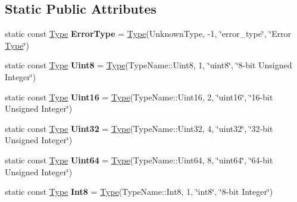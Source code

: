 \subsection*{Static Public Attributes}
\begin{DoxyCompactItemize}
\item 
\mbox{\label{class_arcana_1_1_types_a9f3eec1163e2931ed87aed5e7b847aa5}} 
static const \mbox{\hyperlink{class_arcana_1_1_type}{Type}} {\bfseries Error\+Type} = \mbox{\hyperlink{class_arcana_1_1_type}{Type}}(Unknown\+Type, -\/1, \char`\"{}error\+\_\+type\char`\"{}, \char`\"{}Error \mbox{\hyperlink{class_arcana_1_1_type}{Type}}\char`\"{})
\item 
\mbox{\label{class_arcana_1_1_types_a77949f4b6273c0b012bf2c3928ffce95}} 
static const \mbox{\hyperlink{class_arcana_1_1_type}{Type}} {\bfseries Uint8} = \mbox{\hyperlink{class_arcana_1_1_type}{Type}}(Type\+Name\+::\+Uint8, 1, \char`\"{}uint8\char`\"{}, \char`\"{}8-\/bit Unsigned Integer\char`\"{})
\item 
\mbox{\label{class_arcana_1_1_types_a65012cc73a88ba8c577901fb864b65f9}} 
static const \mbox{\hyperlink{class_arcana_1_1_type}{Type}} {\bfseries Uint16} = \mbox{\hyperlink{class_arcana_1_1_type}{Type}}(Type\+Name\+::\+Uint16, 2, \char`\"{}uint16\char`\"{}, \char`\"{}16-\/bit Unsigned Integer\char`\"{})
\item 
\mbox{\label{class_arcana_1_1_types_a2a4ef23dde14a315f1a377790cd71cde}} 
static const \mbox{\hyperlink{class_arcana_1_1_type}{Type}} {\bfseries Uint32} = \mbox{\hyperlink{class_arcana_1_1_type}{Type}}(Type\+Name\+::\+Uint32, 4, \char`\"{}uint32\char`\"{}, \char`\"{}32-\/bit Unsigned Integer\char`\"{})
\item 
\mbox{\label{class_arcana_1_1_types_adbc832e4fa40ea7b507bc4a1814b4168}} 
static const \mbox{\hyperlink{class_arcana_1_1_type}{Type}} {\bfseries Uint64} = \mbox{\hyperlink{class_arcana_1_1_type}{Type}}(Type\+Name\+::\+Uint64, 8, \char`\"{}uint64\char`\"{}, \char`\"{}64-\/bit Unsigned Integer\char`\"{})
\item 
\mbox{\label{class_arcana_1_1_types_a354530c3a8ddce67f62a095777082ec9}} 
static const \mbox{\hyperlink{class_arcana_1_1_type}{Type}} {\bfseries Int8} = \mbox{\hyperlink{class_arcana_1_1_type}{Type}}(Type\+Name\+::\+Int8, 1, \char`\"{}int8\char`\"{}, \char`\"{}8-\/bit Integer\char`\"{})

\end{DoxyCompactItemize}

